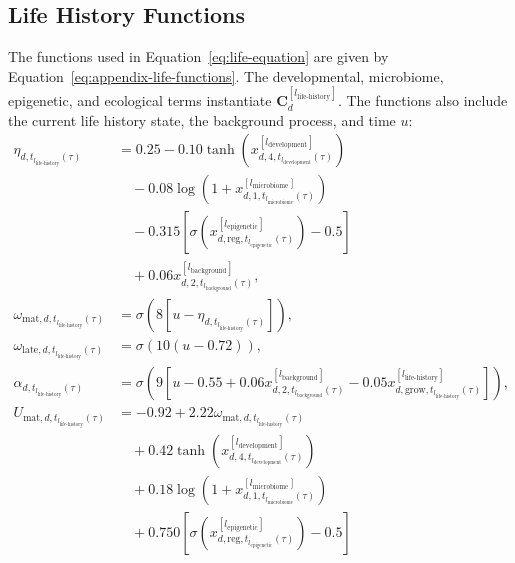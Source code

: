 \documentclass[11pt]{article}
\begin{document}
\subsection{Life History Functions}
The functions used in Equation~\ref{eq:life-equation} are given by Equation~\ref{eq:appendix-life-functions}. The developmental, microbiome, epigenetic, and ecological terms instantiate $\mathbf{C}^{[l_{\mathrm{life\text{-}history}}]}_d$. The functions also include the current life history state, the background process, and time $u$:
\begin{equation}
\begin{aligned}
\eta_{d,t_{l_{\mathrm{life\text{-}history}}}(\tau)}
&=0.25
-0.10\tanh\!\left(
x^{[l_{\mathrm{development}}]}_{d,4,t_{l_{\mathrm{development}}}(\tau)}
\right)\\
&\quad
-0.08\log\!\left(
1+x^{[l_{\mathrm{microbiome}}]}_{d,1,t_{l_{\mathrm{microbiome}}}(\tau)}
\right)\\
&\quad
-0.315\left[
\sigma\!\left(
x^{[l_{\mathrm{epigenetic}}]}_{d,\mathrm{reg},t_{l_{\mathrm{epigenetic}}}(\tau)}
\right)-0.5
\right]\\
&\quad
+0.06x^{[l_{\mathrm{background}}]}_{d,2,t_{l_{\mathrm{background}}}(\tau)},\\
\omega_{\mathrm{mat},d,t_{l_{\mathrm{life\text{-}history}}}(\tau)}
&=
\sigma\!\left(
8\left[
u-\eta_{d,t_{l_{\mathrm{life\text{-}history}}}(\tau)}
\right]
\right),\\
\omega_{\mathrm{late},d,t_{l_{\mathrm{life\text{-}history}}}(\tau)}
&=
\sigma\!\left(10(u-0.72)\right),\\
\alpha_{d,t_{l_{\mathrm{life\text{-}history}}}(\tau)}
&=
\sigma\!\left(
9\left[
u-0.55
+0.06x^{[l_{\mathrm{background}}]}_{d,2,t_{l_{\mathrm{background}}}(\tau)}
-0.05x^{[l_{\mathrm{life\text{-}history}}]}_{d,\mathrm{grow},t_{l_{\mathrm{life\text{-}history}}}(\tau)}
\right]
\right),\\
U_{\mathrm{mat},d,t_{l_{\mathrm{life\text{-}history}}}(\tau)}
&=-0.92
+2.22\omega_{\mathrm{mat},d,t_{l_{\mathrm{life\text{-}history}}}(\tau)}\\
&\quad
+0.42\tanh\!\left(
x^{[l_{\mathrm{development}}]}_{d,4,t_{l_{\mathrm{development}}}(\tau)}
\right)\\
&\quad
+0.18\log\!\left(
1+x^{[l_{\mathrm{microbiome}}]}_{d,1,t_{l_{\mathrm{microbiome}}}(\tau)}
\right)\\
&\quad
+0.750\left[
\sigma\!\left(
x^{[l_{\mathrm{epigenetic}}]}_{d,\mathrm{reg},t_{l_{\mathrm{epigenetic}}}(\tau)}
\right)-0.5
\right]\\

\end{aligned}
\end{equation}
\end{document}
